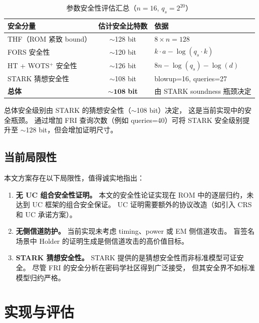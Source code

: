 \documentclass[11pt,a4paper]{ctexart}
\begin{document}
\begin{table}[h]
\centering
\caption{参数安全性评估汇总（$n=16$, $q_s = 2^{20}$）}
\label{tab:paramsecurity}
\begin{tabular}{@{}lcl@{}}
\toprule
\textbf{安全分量} & \textbf{估计安全比特数} & \textbf{依据} \\
\midrule
THF（ROM 紧致 bound） & $\sim$128 bit & $8 \times n = 128$ \\
FORS 安全性           & $\sim$120 bit & $k \cdot a - \log(q_s \cdot k)$ \\
HT + WOTS$^+$ 安全性  & $\sim$126 bit & $8n - \log(q_s) - \log(d)$ \\
STARK 猜想安全性      & $\sim$108 bit & blowup=16, queries=27 \\
\midrule
\textbf{总体}          & $\mathbf{\sim 108}$\textbf{ bit} & 由 STARK soundness 瓶颈决定 \\
\bottomrule
\end{tabular}
\end{table}

总体安全级别由 STARK 的猜想安全性（$\sim$108 bit）决定，
这是当前实现中的安全瓶颈。
通过增加 FRI 查询次数（例如 queries=40）可将 STARK 安全级别提升至
$\sim$128 bit，但会增加证明尺寸。

\subsection{当前局限性}

本文方案存在以下局限性，值得诚实地指出：

\begin{enumerate}[leftmargin=*]
\item \textbf{无 UC 组合安全性证明。}
本文的安全性论证实现在 ROM 中的逐层归约，未达到 UC 框架的组合安全保证。
UC 证明需要额外的协议改造（如引入 CRS 和 UC 承诺方案）。
\item \textbf{无侧信道防护。}
当前实现未考虑 timing、power 或 EM 侧信道攻击。
盲签名场景中 Holder 的证明生成是侧信道攻击的高价值目标。
\item \textbf{STARK 猜想安全性。}
STARK 提供的是猜想安全性而非标准模型可证安全。
尽管 FRI 的安全分析在密码学社区得到广泛接受，
但其安全界不如标准模型归约严格。
\end{enumerate}

\section{实现与评估}
\end{document}

